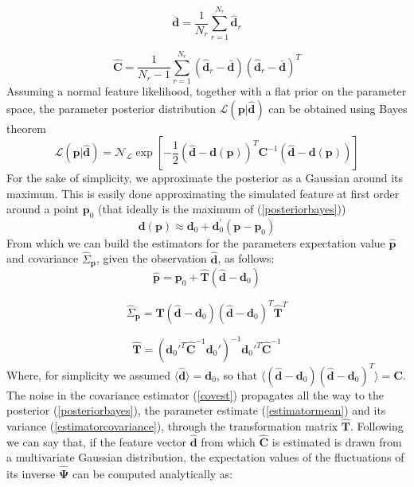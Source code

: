 \documentclass[reprint,aps,prd,superscriptaddress,showkeys,showpacs]{revtex4-1}
\newcommand{\bb}[1]{\mathbf{#1}}
\newcommand{\bbh}[1]{\mathbf{\hat{#1}}}
\newcommand{\h}[1]{\hat{#1}}
\begin{document}
\begin{equation}
\bb{\bar{d}} = \frac{1}{N_r}\sum_{r=1}^{N_r} \bbh{d}_r
\end{equation}

\begin{equation}
\label{covest}
\bbh{C} = \frac{1}{N_r-1}\sum_{r=1}^{N_r} (\bbh{d}_r - \bar{\bb{d}}) (\bbh{d}_r - \bar{\bb{d}})^T
\end{equation}
%
Assuming a normal feature likelihood, together with a flat prior on the parameter space, the parameter posterior distribution $\mathcal{L}(\bb{p}\vert\bbh{d})$ can be obtained using Bayes theorem
\begin{equation}
\label{posteriorbayes}
\mathcal{L}(\bb{p}\vert\bbh{d}) = \mathcal{N}_\mathcal{L}\exp{\left[-\frac{1}{2}(\bbh{d}-\bb{d}(\bb{p}))^T\bb{C}^{-1}(\bbh{d}-\bb{d}(\bb{p}))\right]}
\end{equation}
%
For the sake of simplicity, we approximate the posterior as a Gaussian around its maximum. This is easily done approximating the simulated feature at first order around a point $\bb{p}_0$ (that ideally is the maximum of (\ref{posteriorbayes}))
\begin{equation}
\bb{d}(\bb{p}) \approx \bb{d}_0 + \bb{d}_0^\prime(\bb{p}-\bb{p}_0) 
\end{equation}
%
From which we can build the estimators for the parameters expectation value $\bbh{p}$ and covariance $\h{\Sigma}_\bb{p}$, given the observation $\bbh{d}$, as follows:
%
\begin{equation}
\label{estimatormean}
\bbh{p} = \bb{p}_0 + \bbh{T}(\bbh{d}-\bb{d}_0)
\end{equation}

\begin{equation}
\label{estimatorcovariance}
\h{\Sigma}_\bb{p} = \bbh{T}(\bbh{d}-\bb{d}_0)(\bbh{d}-\bb{d}_0)^T\bbh{T}^T
\end{equation}

\begin{equation}
\bbh{T} = (\bb{d}_0'^T\bbh{C}^{-1}\bb{d}_0')^{-1}\bb{d}_0'^T\bbh{C}^{-1}
\end{equation}
%
Where, for simplicity we assumed $\langle\bbh{d}\rangle=\bb{d}_0$, so that $\langle(\bbh{d}-\bb{d}_0)(\bbh{d}-\bb{d}_0)^T\rangle=\bb{C}$. The noise in the covariance estimator (\ref{covest}) propagates all the way to the posterior (\ref{posteriorbayes}), the parameter estimate (\ref{estimatormean}) and its variance (\ref{estimatorcovariance}), through the transformation matrix $\bbh{T}$. Following \citep{Taylor12} we can say that, if the feature vector $\bbh{d}$ from which $\bbh{C}$ is estimated is drawn from a multivariate Gaussian distribution, the expectation values of the fluctuations of its inverse $\bbh{\Psi}$ can be computed analytically as:
\end{document}
